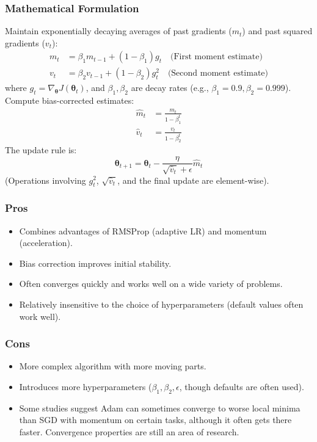 \documentclass{article}
\newcommand{\btheta}{\bm{\theta}}
\begin{document}
\subsubsection{Mathematical Formulation}
Maintain exponentially decaying averages of past gradients ($m_t$) and past squared gradients ($v_t$):
\begin{align}
    m_t &= \beta_1 m_{t-1} + (1-\beta_1) g_t \quad \text{(First moment estimate)} \\
    v_t &= \beta_2 v_{t-1} + (1-\beta_2) g_t^2 \quad \text{(Second moment estimate)}
\end{align}
where $g_t = \nabla_{\btheta} J(\btheta_t)$, and $\beta_1, \beta_2$ are decay rates (e.g., $\beta_1=0.9, \beta_2=0.999$). Compute bias-corrected estimates:
\begin{align}
    \hat{m}_t &= \frac{m_t}{1 - \beta_1^t} \\
    \hat{v}_t &= \frac{v_t}{1 - \beta_2^t}
\end{align}
The update rule is:
\begin{equation}
    \btheta_{t+1} = \btheta_t - \frac{\eta}{\sqrt{\hat{v}_t} + \epsilon} \hat{m}_t
\end{equation}
(Operations involving $g_t^2$, $\sqrt{\hat{v}_t}$, and the final update are element-wise).

\subsubsection{Pros}
\begin{itemize}
    \item Combines advantages of RMSProp (adaptive LR) and momentum (acceleration).
    \item Bias correction improves initial stability.
    \item Often converges quickly and works well on a wide variety of problems.
    \item Relatively insensitive to the choice of hyperparameters (default values often work well).
\end{itemize}

\subsubsection{Cons}
\begin{itemize}
    \item More complex algorithm with more moving parts.
    \item Introduces more hyperparameters ($\beta_1, \beta_2, \epsilon$, though defaults are often used).
    \item Some studies suggest Adam can sometimes converge to worse local minima than SGD with momentum on certain tasks, although it often gets there faster. Convergence properties are still an area of research.
\end{itemize}
\end{document}
